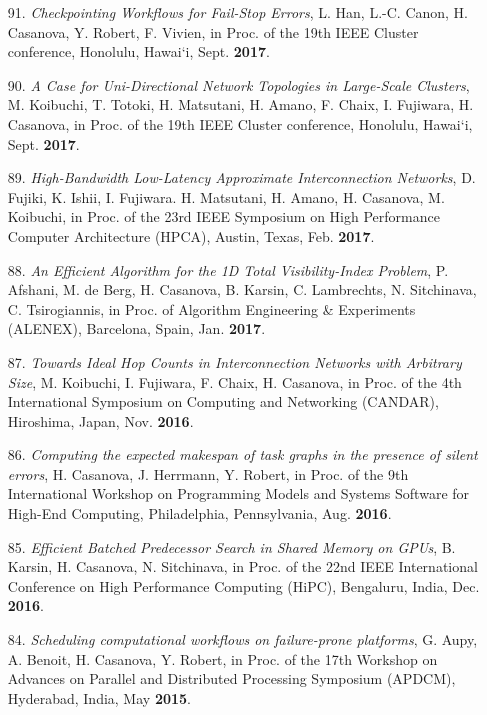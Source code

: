 \begin{enumerate}
\item [91.] {\it Checkpointing Workflows for Fail-Stop Errors},
L. Han, L.-C. Canon, H. Casanova, Y. Robert, F. Vivien, 
in Proc. of the 19th IEEE Cluster conference, Honolulu, Hawai`i, Sept. {\bf 2017}. 

\item [90.] {\it A Case for Uni-Directional Network Topologies in Large-Scale Clusters}, 
M. Koibuchi, T. Totoki, H. Matsutani, H. Amano, F. Chaix, I. Fujiwara, H. Casanova, 
in Proc. of the 19th IEEE Cluster conference, Honolulu, Hawai`i, Sept. {\bf 2017}. 

\item [89.] {\it High-Bandwidth Low-Latency Approximate Interconnection
Networks}, D. Fujiki, K. Ishii, I. Fujiwara. H. Matsutani, H. Amano, H.
Casanova, M. Koibuchi, in Proc. of the 23rd IEEE Symposium on High
Performance Computer Architecture (HPCA), Austin, Texas, Feb. {\bf 2017}.

\item [88.] {\it An Efficient Algorithm for the 1D Total Visibility-Index
Problem}, P. Afshani, M. de Berg, H. Casanova, B. Karsin, C. Lambrechts, N.
Sitchinava, C. Tsirogiannis, in Proc. of Algorithm Engineering \&
Experiments (ALENEX), Barcelona, Spain, Jan. {\bf 2017}.

\item [87.] {\it  Towards Ideal Hop Counts in Interconnection Networks with
Arbitrary Size}, M. Koibuchi, I. Fujiwara, F. Chaix, H. Casanova, in Proc.
of the 4th International Symposium on Computing and Networking (CANDAR),
Hiroshima, Japan, Nov.  {\bf 2016}.

\item [86.] {\it Computing the expected makespan of task graphs in the presence of silent errors},
H. Casanova, J. Herrmann, Y. Robert,
in Proc. of the 9th International Workshop on Programming Models and Systems Software for High-End Computing, Philadelphia, Pennsylvania, Aug. {\bf 2016}.


\item [85.] {\it Efficient Batched Predecessor Search in Shared Memory on GPUs},
B. Karsin, H. Casanova, N. Sitchinava, in Proc. of 
the 22nd IEEE International Conference on High Performance Computing (HiPC),
Bengaluru, India, Dec. {\bf 2016}. 

\item [84.] {\it Scheduling computational workflows on failure-prone
platforms}, G. Aupy, A. Benoit, H. Casanova, Y.  Robert, in Proc. of
the 17th Workshop on Advances on Parallel and Distributed Processing
Symposium (APDCM), Hyderabad, India, May {\bf 2015}.




\end{enumerate}
